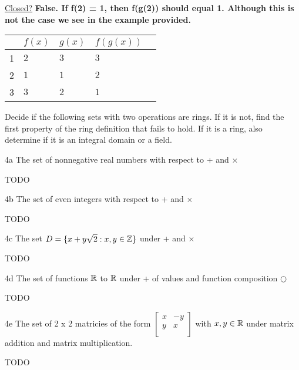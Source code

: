 \underline{Closed?} \textbf{False. If f(2) = 1, then f(g(2)) should equal 1. Although this is not the case we see in the example provided. }

\begin{tabular}{l|llll}
    & $f(x)$ & $g(x)$ & $f(g(x))$ \\
    \hline
 1  & $2$    & $3$    & $3$ \\
 2  & $1$    & $1$    & $2$ \\
 3  & $3$    & $2$    & $1$ \\
\end{tabular}


\begin{question}{4}
Decide if the following sets with two operations are rings. If it is not, find the first property of the ring definition that fails to hold. If it is a ring, also determine if it is an integral domain or a field.
\end{question}


\begin{question}{4a}
The set of nonnegative real numbers with respect to + and $\times$
\end{question}

TODO

\begin{question}{4b}
The set of even integers with respect to + and $\times$
\end{question}

TODO

\begin{question}{4c}
The set $D = \{x+y\sqrt{2} : x, y \in \mathbb{Z}\}$ under + and $\times$
\end{question}

TODO

\begin{question}{4d}
The set of functions $\mathbb{R}$ to $\mathbb{R}$ under + of values and function composition $\bigcirc$
\end{question}

TODO

\begin{question}{4e}
The set of 2 x 2 matricies of the form $\begin{bmatrix}
  x & -y \\
  y & x  \\
 \end{bmatrix}$ with $x,y \in \mathbb{R}$ under matrix addition and matrix multiplication. 
\end{question}

TODO

